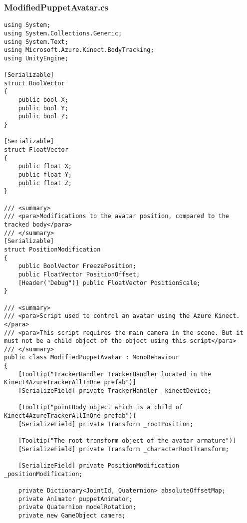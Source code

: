 \subsubsection*{ModifiedPuppetAvatar.cs}
\begin{verbatim}
using System;
using System.Collections.Generic;
using System.Text;
using Microsoft.Azure.Kinect.BodyTracking;
using UnityEngine;

[Serializable]
struct BoolVector
{
    public bool X;
    public bool Y;
    public bool Z;
}

[Serializable]
struct FloatVector
{
    public float X;
    public float Y;
    public float Z;
}

/// <summary>
/// <para>Modifications to the avatar position, compared to the tracked body</para>
/// </summary>
[Serializable]
struct PositionModification
{
    public BoolVector FreezePosition;
    public FloatVector PositionOffset;
    [Header("Debug")] public FloatVector PositionScale;
}

/// <summary>
/// <para>Script used to control an avatar using the Azure Kinect.</para>
/// <para>This script requires the main camera in the scene. But it must not be a child object of the object using this script</para>
/// </summary>
public class ModifiedPuppetAvatar : MonoBehaviour
{
    [Tooltip("TrackerHandler TrackerHandler located in the Kinect4AzureTrackerAllInOne prefab")] 
    [SerializeField] private TrackerHandler _kinectDevice;

    [Tooltip("pointBody object which is a child of Kinect4AzureTrackerAllInOne prefab")] 
    [SerializeField] private Transform _rootPosition;

    [Tooltip("The root transform object of the avatar armature")] 
    [SerializeField] private Transform _characterRootTransform;

    [SerializeField] private PositionModification _positionModification;

    private Dictionary<JointId, Quaternion> absoluteOffsetMap;
    private Animator puppetAnimator;
    private Quaternion modelRotation;
    private new GameObject camera;


\end{verbatim}
